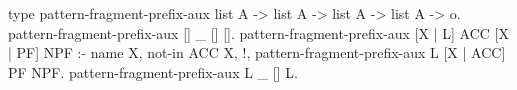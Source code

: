 \begin{elpicode}
type pattern-fragment-prefix-aux list A -> list A -> list A -> list A -> o.
pattern-fragment-prefix-aux [] _ [] [].
pattern-fragment-prefix-aux [X | L] ACC [X | PF] NPF :- name X, not-in ACC X, !, 
  pattern-fragment-prefix-aux L [X | ACC] PF NPF.
pattern-fragment-prefix-aux L _ [] L.
\end{elpicode}
